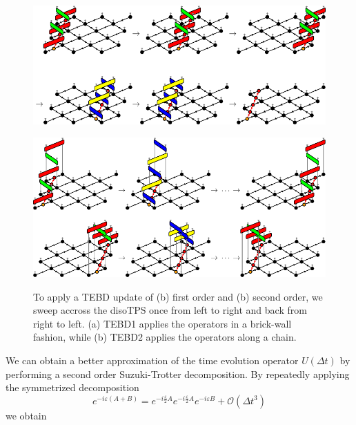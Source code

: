 \begin{figure}
	\centering
	\subcaptionbox{\label{fig:disoTPS_TEBD_global_update_applying_TEBD1}}
	{%
		\includegraphics[scale=1]{figures/tikz/disoTPS/tebd_global_update_steps/tebd_global_update_steps_a.pdf}
	}
	\par\bigskip
	\subcaptionbox{\label{fig:disoTPS_TEBD_global_update_applying_TEBD2}}
	{%
		\includegraphics[scale=1]{figures/tikz/disoTPS/tebd_global_update_steps/tebd_global_update_steps_b.pdf}
	}
	\caption{To apply a TEBD update of (b) first order and (b) second order, we sweep accross the disoTPS once from left to right and back from right to left. (a) TEBD1 applies the operators in a brick-wall fashion, while (b) TEBD2 applies the operators along a chain. }
	\label{fig:disoTPS_TEBD_global_update_applying_TEBD}
\end{figure}
We can obtain a better approximation of the time evolution operator $U(\Delta t)$ by performing a second order Suzuki-Trotter decomposition. By repeatedly applying the symmetrized decomposition
\begin{equation}
	e^{-i\varepsilon(A+B)} = e^{-i\frac{\varepsilon}{2}A}e^{-i\frac{\varepsilon}{2}A}e^{-i\varepsilon B} + \mathcal{O}(\Delta t^3)
\end{equation}
we obtain
